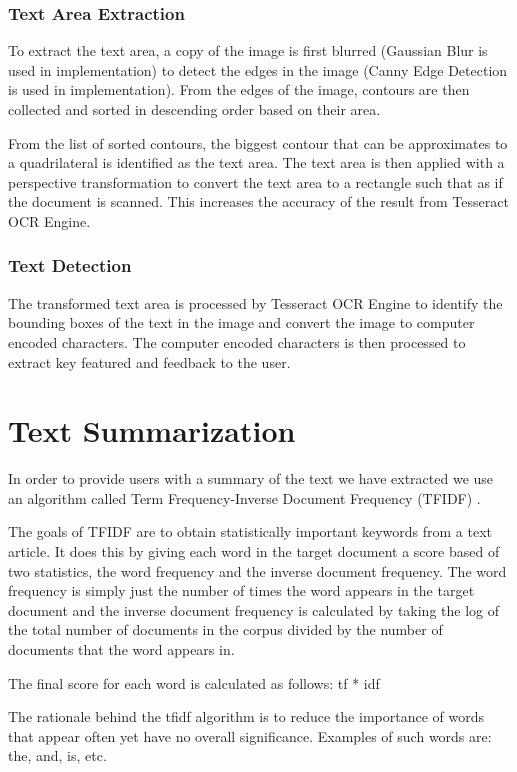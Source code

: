 \subsubsection{Text Area Extraction}
To extract the text area, a copy of the image is first blurred (Gaussian Blur is used in implementation) to detect the edges in the image (Canny Edge Detection is used in implementation). From the edges of the image, contours are then collected and sorted in descending order based on their area.


From the list of sorted contours, the biggest contour that can be approximates to a quadrilateral is identified as the text area. The text area is then applied with a perspective transformation to convert the text area to a rectangle such that as if the document is scanned. This increases the accuracy of the result from Tesseract OCR Engine. 

\subsubsection{Text Detection}
The transformed text area is processed by Tesseract OCR Engine to identify the bounding boxes of the text in the image and convert the image to computer encoded characters. The computer encoded characters is then processed to extract key featured and feedback to the user.

\section{Text Summarization}
In order to provide users with a summary of the text we have extracted we use an algorithm called Term Frequency-Inverse Document Frequency (TFIDF) .

The goals of TFIDF are to obtain statistically important keywords from a text article. 
It does this by giving each word in the target document a score based of two statistics, the word frequency and the inverse document frequency.
The word frequency is simply just the number of times the word appears in the target document and the inverse document frequency is calculated by taking the log of the total number of documents in the corpus divided by the number of documents that the word appears in.

The final score for each word is calculated as follows: tf * idf

The rationale behind the tfidf algorithm is to reduce the importance of words that appear often yet have no overall significance. Examples of such words are: the, and, is, etc.

